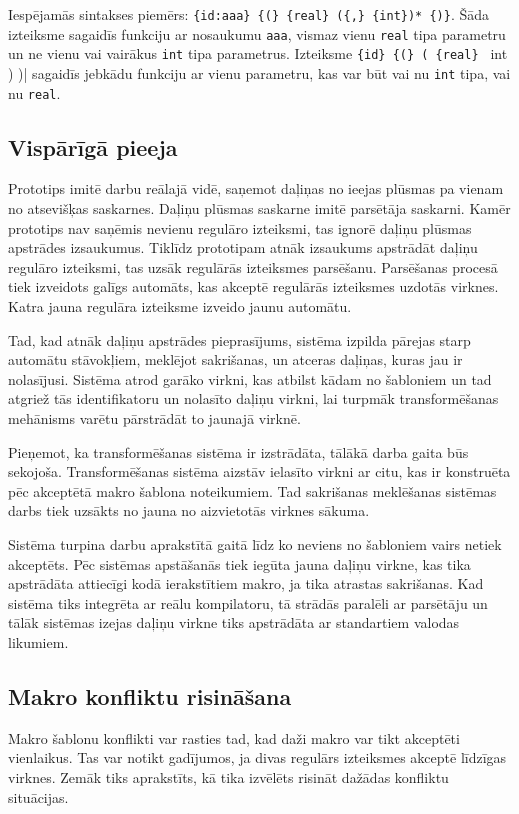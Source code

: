 Iespējamās sintakses piemērs: \verb|{id:aaa} {(} {real} ({,} {int})* {)}|. Šāda izteiksme sagaidīs funkciju ar nosaukumu \verb|aaa|, vismaz vienu \verb|real| tipa parametru un ne vienu vai vairākus \verb|int| tipa parametrus. Izteiksme \verb|{id} {(} ( {real} | {int} ) {)}| sagaidīs jebkādu funkciju ar vienu parametru, kas var būt vai nu \verb|int| tipa, vai nu \verb|real|.

\subsection{\label{sbs:prot_approach}Vispārīgā pieeja}

Prototips imitē darbu reālajā vidē, saņemot daļiņas no ieejas plūsmas pa vienam no atsevišķas saskarnes. Daļiņu plūsmas saskarne imitē parsētāja saskarni. Kamēr prototips nav saņēmis nevienu regulāro izteiksmi, tas ignorē daļiņu plūsmas apstrādes izsaukumus. Tiklīdz prototipam atnāk izsaukums apstrādāt daļiņu regulāro izteiksmi, tas uzsāk regulārās izteiksmes parsēšanu. Parsēšanas procesā tiek izveidots galīgs automāts, kas akceptē regulārās izteiksmes uzdotās virknes. Katra jauna regulāra izteiksme izveido jaunu automātu.

Tad, kad atnāk daļiņu apstrādes pieprasījums, sistēma izpilda pārejas starp automātu stāvokļiem, meklējot sakrišanas, un atceras daļiņas, kuras jau ir nolasījusi. Sistēma atrod garāko virkni, kas atbilst kādam no šabloniem un tad atgriež tās identifikatoru un nolasīto daļiņu virkni, lai turpmāk transformēšanas mehānisms varētu pārstrādāt to jaunajā virknē.

Pieņemot, ka transformēšanas sistēma ir izstrādāta, tālākā darba gaita būs sekojoša. Transformēšanas sistēma aizstāv ielasīto virkni ar citu, kas ir konstruēta pēc akceptētā makro šablona noteikumiem. Tad sakrišanas meklēšanas sistēmas darbs tiek uzsākts no jauna no aizvietotās virknes sākuma.

Sistēma turpina darbu aprakstītā gaitā līdz ko neviens no šabloniem vairs netiek akceptēts. Pēc sistēmas apstāšanās tiek iegūta jauna daļiņu virkne, kas tika apstrādāta attiecīgi kodā ierakstītiem makro, ja tika atrastas sakrišanas. Kad sistēma tiks integrēta ar reālu kompilatoru, tā strādās paralēli ar parsētāju un tālāk sistēmas izejas daļiņu virkne tiks apstrādāta ar standartiem valodas likumiem.

\subsection{\label{sbs:prot_conflictresolving}Makro konfliktu risināšana}
Makro šablonu konflikti var rasties tad, kad daži makro var tikt akceptēti vienlaikus. Tas var notikt gadījumos, ja divas regulārs izteiksmes akceptē līdzīgas virknes. Zemāk tiks aprakstīts, kā tika izvēlēts risināt dažādas konfliktu situācijas. 

